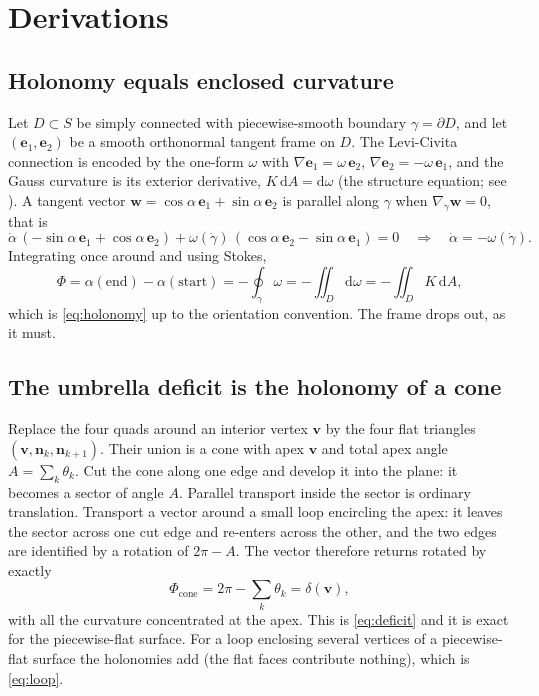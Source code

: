 \section{Derivations}
\label{app:derivations}

\subsection{Holonomy equals enclosed curvature}
\label{app:holonomy}
Let $D\subset S$ be simply connected with piecewise-smooth boundary $\gamma=\partial D$, and let $(\mathbf e_1,\mathbf e_2)$ be a smooth orthonormal tangent frame on $D$. The Levi-Civita connection is encoded by the one-form $\omega$ with $\nabla\mathbf e_1=\omega\,\mathbf e_2$, $\nabla\mathbf e_2=-\omega\,\mathbf e_1$, and the Gauss curvature is its exterior derivative, $K\,\mathrm{d}A=\mathrm{d}\omega$ (the structure equation; see \cite{docarmo}). A tangent vector $\mathbf w=\cos\alpha\,\mathbf e_1+\sin\alpha\,\mathbf e_2$ is parallel along $\gamma$ when $\nabla_{\dot\gamma}\mathbf w=0$, that is
\[
\dot\alpha\,(-\sin\alpha\,\mathbf e_1+\cos\alpha\,\mathbf e_2)+\omega(\dot\gamma)\,(\cos\alpha\,\mathbf e_2-\sin\alpha\,\mathbf e_1)=0
\quad\Longrightarrow\quad \dot\alpha=-\omega(\dot\gamma).
\]
Integrating once around and using Stokes,
\[
\Phi=\alpha(\text{end})-\alpha(\text{start})=-\oint_{\gamma}\omega=-\iint_{D}\mathrm{d}\omega=-\iint_{D}K\,\mathrm{d}A ,
\]
which is \cref{eq:holonomy} up to the orientation convention. The frame drops out, as it must.

\subsection{The umbrella deficit is the holonomy of a cone}
\label{app:gaussbonnet}
Replace the four quads around an interior vertex $\mathbf v$ by the four flat triangles $(\mathbf v,\mathbf n_k,\mathbf n_{k+1})$. Their union is a cone with apex $\mathbf v$ and total apex angle $A=\sum_k\theta_k$. Cut the cone along one edge and develop it into the plane: it becomes a sector of angle $A$. Parallel transport inside the sector is ordinary translation. Transport a vector around a small loop encircling the apex: it leaves the sector across one cut edge and re-enters across the other, and the two edges are identified by a rotation of $2\pi-A$. The vector therefore returns rotated by exactly
\[
\Phi_{\text{cone}}=2\pi-\sum_k\theta_k=\delta(\mathbf v),
\]
with all the curvature concentrated at the apex. This is \cref{eq:deficit} and it is exact for the piecewise-flat surface. For a loop enclosing several vertices of a piecewise-flat surface the holonomies add (the flat faces contribute nothing), which is \cref{eq:loop}.

